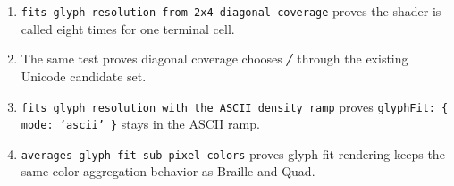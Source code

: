 \begin{enumerate}
\def\labelenumi{\arabic{enumi}.}
\tightlist
\item
  \texttt{f\allowbreak{}i\allowbreak{}t\allowbreak{}s\allowbreak{} \allowbreak{}g\allowbreak{}l\allowbreak{}y\allowbreak{}p\allowbreak{}h\allowbreak{} \allowbreak{}r\allowbreak{}e\allowbreak{}s\allowbreak{}o\allowbreak{}l\allowbreak{}u\allowbreak{}t\allowbreak{}i\allowbreak{}o\allowbreak{}n\allowbreak{} \allowbreak{}f\allowbreak{}r\allowbreak{}o\allowbreak{}m\allowbreak{} \allowbreak{}2\allowbreak{}x\allowbreak{}4\allowbreak{} \allowbreak{}d\allowbreak{}i\allowbreak{}a\allowbreak{}g\allowbreak{}o\allowbreak{}n\allowbreak{}a\allowbreak{}l\allowbreak{} \allowbreak{}c\allowbreak{}o\allowbreak{}v\allowbreak{}e\allowbreak{}r\allowbreak{}a\allowbreak{}g\allowbreak{}e} proves the shader is called eight times for one terminal cell.
\item
  The same test proves diagonal coverage chooses \texttt{╱} through the existing Unicode candidate set.
\item
  \texttt{f\allowbreak{}i\allowbreak{}t\allowbreak{}s\allowbreak{} \allowbreak{}g\allowbreak{}l\allowbreak{}y\allowbreak{}p\allowbreak{}h\allowbreak{} \allowbreak{}r\allowbreak{}e\allowbreak{}s\allowbreak{}o\allowbreak{}l\allowbreak{}u\allowbreak{}t\allowbreak{}i\allowbreak{}o\allowbreak{}n\allowbreak{} \allowbreak{}w\allowbreak{}i\allowbreak{}t\allowbreak{}h\allowbreak{} \allowbreak{}t\allowbreak{}h\allowbreak{}e\allowbreak{} \allowbreak{}A\allowbreak{}S\allowbreak{}C\allowbreak{}I\allowbreak{}I\allowbreak{} \allowbreak{}d\allowbreak{}e\allowbreak{}n\allowbreak{}s\allowbreak{}i\allowbreak{}t\allowbreak{}y\allowbreak{} \allowbreak{}r\allowbreak{}a\allowbreak{}m\allowbreak{}p} proves \texttt{g\allowbreak{}l\allowbreak{}y\allowbreak{}p\allowbreak{}h\allowbreak{}F\allowbreak{}i\allowbreak{}t\allowbreak{}:\allowbreak{} \allowbreak{}\{\allowbreak{} \allowbreak{}m\allowbreak{}o\allowbreak{}d\allowbreak{}e\allowbreak{}:\allowbreak{} \allowbreak{}'\allowbreak{}a\allowbreak{}s\allowbreak{}c\allowbreak{}i\allowbreak{}i\allowbreak{}'\allowbreak{} \allowbreak{}\}} stays in the ASCII ramp.
\item
  \texttt{a\allowbreak{}v\allowbreak{}e\allowbreak{}r\allowbreak{}a\allowbreak{}g\allowbreak{}e\allowbreak{}s\allowbreak{} \allowbreak{}g\allowbreak{}l\allowbreak{}y\allowbreak{}p\allowbreak{}h\allowbreak{}-\allowbreak{}f\allowbreak{}i\allowbreak{}t\allowbreak{} \allowbreak{}s\allowbreak{}u\allowbreak{}b\allowbreak{}-\allowbreak{}p\allowbreak{}i\allowbreak{}x\allowbreak{}e\allowbreak{}l\allowbreak{} \allowbreak{}c\allowbreak{}o\allowbreak{}l\allowbreak{}o\allowbreak{}r\allowbreak{}s} proves glyph-fit rendering keeps the same color aggregation behavior as Braille and Quad.
\end{enumerate}

